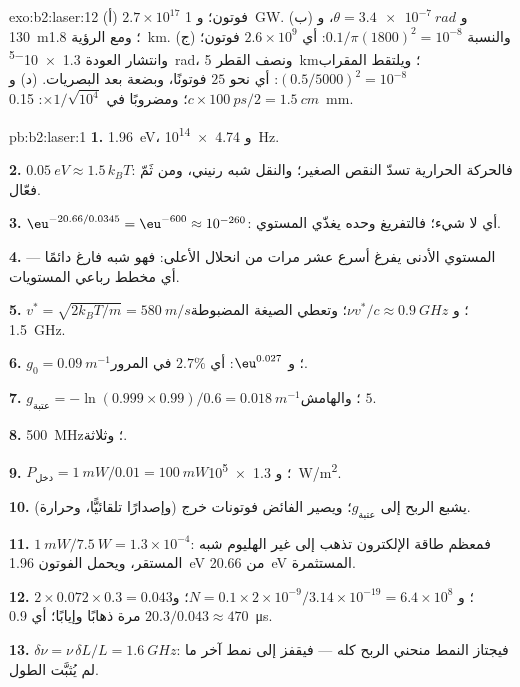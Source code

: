 \begin{solution}{exo:b2:laser:12}
(أ) $2.7 \times 10^{17}$ فوتون؛ و \qty{1}{GW}. (ب) و $\theta = \qty{3.4e-7}{rad}$،
و \qty{130}{m}؛ ومع الرؤية \qty{1.8}{km}. (ج) والنسبة $0.1/\pi(1800)^2 =
10^{-8}$: أي $2.6 \times 10^9$ فوتون؛ وانتشار العودة \qty{1.3e-5}{rad}، ونصف القطر
\qty{5}{km}؛ ويلتقط المقراب $(0.5/5000)^2 = 10^{-8}$: أي نحو $25$
فوتونًا، وبضعة بعد البصريات. (د) و $c \times \qty{100}{ps}/2 = \qty{1.5}{cm}$؛
ومضروبًا في $\times 1/\sqrt{10^4}$: \qty{0.15}{mm}.
\end{solution}

\begin{solution}{pb:b2:laser:1}
\textbf{1.} \qty{1.96}{eV}، و \qty{4.74e14}{Hz}.

\textbf{2.} $\qty{0.05}{eV} \approx 1.5\,k_BT$: فالحركة الحرارية تسدّ
النقص الصغير؛ والنقل شبه رنيني، ومن ثَمّ فعّال.

\textbf{3.} $\eu^{-20.66/0.0345} = \eu^{-600} \approx 10^{-260}$: أي لا شيء؛ فالتفريغ
وحده يغذّي المستوي.

\textbf{4.} المستوي الأدنى يفرغ أسرع عشر مرات من انحلال
الأعلى: فهو شبه فارغ دائمًا --- أي مخطط رباعي المستويات.

\textbf{5.} $v^* = \sqrt{2k_BT/m} = \qty{580}{m/s}$؛ و $\nu v^*/c \approx \qty{0.9}{GHz}$؛
وتعطي الصيغة المضبوطة \qty{1.5}{GHz}.

\textbf{6.} $g_0 = \qty{0.09}{m^{-1}}$؛ و $\eu^{0.027}$: أي $2.7\%$ في المرور.

\textbf{7.} $g_{\text{عتبة}} = -\ln(0.999 \times 0.99)/0.6 = \qty{0.018}{m^{-1}}$؛
والهامش $5$.

\textbf{8.} \qty{500}{MHz}؛ وثلاثة.

\textbf{9.} $P_{\text{دخل}} = \qty{1}{mW}/0.01 = \qty{100}{mW}$؛ و \qty{1.3e5}{W/m^2}.

\textbf{10.} يشبع الربح إلى $g_{\text{عتبة}}$؛ ويصير الفائض
فوتونات خرج (وإصدارًا تلقائيًّا، وحرارة).

\textbf{11.} $\qty{1}{mW}/\qty{7.5}{W} = 1.3 \times 10^{-4}$: فمعظم
طاقة الإلكترون تذهب إلى غير الهليوم شبه المستقر، ويحمل
الفوتون \qty{1.96}{eV} من \qty{20.66}{eV} المستثمرة.

\textbf{12.} $2 \times 0.072 \times 0.3 = 0.043$؛ و $N = 0.1 \times 2 \times 10^{-9}/3.14
\times 10^{-19} = 6.4 \times 10^8$؛ و $20.3/0.043 \approx 470$ مرة ذهابًا وإيابًا؛
أي \qty{0.9}{\micro s}.

\textbf{13.} $\delta\nu = \nu\,\delta L/L = \qty{1.6}{GHz}$: فيجتاز النمط
منحني الربح كله --- فيقفز  إلى نمط آخر ما لم يُثبَّت
الطول.


\end{solution}
